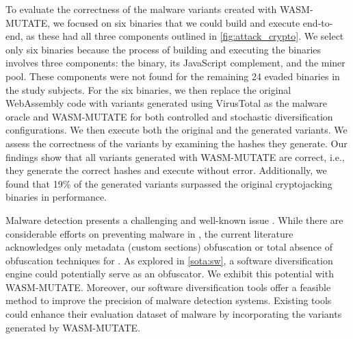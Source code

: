 \vspace{5mm}
\begin{strategy}
    \label{evasion_impact}
    To evaluate the correctness of the malware variants created with WASM-MUTATE, we focused on six binaries that we could build and execute end-to-end, as these had all three components outlined in \autoref{fig:attack_crypto}. 
    We select only six binaries because the process of building and executing the binaries involves three components: the \Wasm binary, its JavaScript complement, and the miner pool. 
    These components were not found for the remaining 24 evaded binaries in the study subjects.
    For the six binaries, we then replace the original WebAssembly code with variants generated using VirusTotal as the malware oracle and WASM-MUTATE for both controlled and stochastic diversification configurations. 
    We then execute both the original and the generated variants. 
    We assess the correctness of the variants by examining the hashes they generate.
    Our findings show that all variants generated with WASM-MUTATE are correct, i.e., they generate the correct hashes and execute without error.
    Additionally, we found that 19\% of the generated variants surpassed the original cryptojacking binaries in performance.
\end{strategy}



\begin{tcolorbox}[title=Reflection,boxrule=1pt,arc=.2em,boxsep=1.0mm]  
    Malware detection presents a challenging and well-known issue \cite{cohen1987computer}. 
    While there are considerable efforts on preventing malware in \Wasm, the current literature acknowledges only metadata (\Wasm custom sections) obfuscation or total absence of obfuscation techniques for \Wasm \cite{Minesweeper, MinerRay, SEISMIC, RAPID, MINOS}. 
    As explored in \autoref{sota:sw}, a software diversification engine could potentially serve as an obfuscator. 
    We exhibit this potential with WASM-MUTATE. 
    Moreover, our software diversification tools offer a feasible method to improve the precision of \Wasm malware detection systems. 
    Existing tools could enhance their evaluation dataset of \Wasm malware by incorporating the variants generated by WASM-MUTATE.


\end{tcolorbox}


